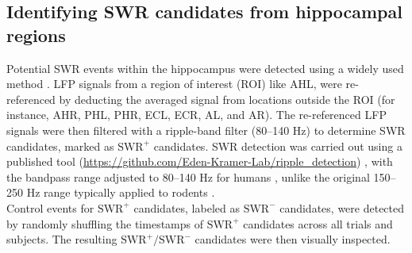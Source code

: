 \subsection{Identifying SWR candidates from hippocampal regions}
Potential SWR events within the hippocampus were detected using a widely used method \cite{liu_consensus_2022}. LFP signals from a region of interest (ROI) like AHL, were re-referenced by deducting the averaged signal from locations outside the ROI (for instance, AHR, PHL, PHR, ECL, ECR, AL, and AR). The re-referenced LFP signals were then filtered with a ripple-band filter (80--140 Hz) to determine SWR candidates, marked as $\textrm{SWR}^+$ candidates. SWR detection was carried out using a published tool (\url{https://github.com/Eden-Kramer-Lab/ripple_detection}) \cite{kay_hippocampal_2016}, with the bandpass range adjusted to 80--140 Hz for humans \cite{norman_hippocampal_2019, norman_hippocampal_2021, liu_consensus_2022}, unlike the original 150--250 Hz range typically applied to rodents \cite{foster_reverse_2006, karlsson_awake_2009, carr_hippocampal_2011, pfeiffer_hippocampal_2013, jadhav_awake_2012, singer_hippocampal_2013, buzsaki_hippocampal_2015, wu_hippocampal_2017, fernandez-ruiz_long-duration_2019}.
\\
\indent
Control events for $\textrm{SWR}^+$ candidates, labeled as $\textrm{SWR}^-$ candidates, were detected by randomly shuffling the timestamps of $\textrm{SWR}^+$ candidates across all trials and subjects. The resulting $\textrm{SWR}^+/\textrm{SWR}^-$ candidates were then visually inspected.
\\
\indent
